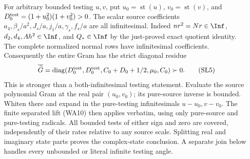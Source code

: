 For arbitrary bounded testing $u,v$, put $u_0=\operatorname{st}(u)$,
$v_0=\operatorname{st}(v)$, and $D_0^{\rm test}=(1+u_0^2)(1+v_0^2)>0$.
The scalar source coefficients
$a_4,\beta_s/a^2,J_s/a,j_1/a,\gamma_s,f_s/a$ are all infinitesimal.
Indeed $nr^2=Nr\in\Inf$, $d_2,d_4,Ah^2\in\Inf$, and
$Q_*\in\Inf$ by the just-proved exact quotient identity.
The complete normalized normal rows have infinitesimal coefficients.
Consequently the entire Gram has the strict diagonal residue
\[
 \overline{\widehat G}
 =\operatorname{diag}(D_0^{\rm test},D_0^{\rm test},
                     C_0+D_0+1/2,\mu_0,C_0)\succ0.       \tag{SL5}
\]
This is stronger than a both-infinitesimal testing statement.
Evaluate the source polynomial Gram at the real pair $(u_0,v_0)$;
its pure-source inverse is bounded. Whiten there and expand in the
pure-testing infinitesimals $u-u_0,v-v_0$. The finite separated
lift (WA10) then applies verbatim, using only pure-source
and pure-testing radicals. All bounded tests of either sign and
zero are covered, independently of their rates relative to any
source scale. Splitting real and imaginary state parts proves the
complex-state conclusion. A separate join below handles every
unbounded or literal infinite testing angle.
